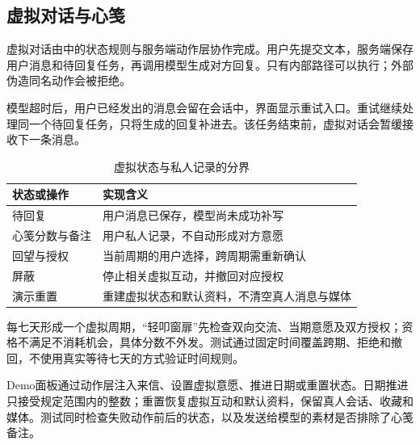 \subsection*{虚拟对话与心笺}
虚拟对话由中的状态规则与服务端动作层协作完成。用户先提交文本，服务端保存用户消息和待回复任务，再调用模型生成对方回复。只有内部路径可以执行；外部伪造同名动作会被拒绝。

模型超时后，用户已经发出的消息会留在会话中，界面显示重试入口。重试继续处理同一个待回复任务，只将生成的回复补进去。该任务结束前，虚拟对话会暂缓接收下一条消息。

\begin{table}[H]\centering\small
\caption{虚拟状态与私人记录的分界}
\begin{tabularx}{\linewidth}{@{}p{30mm}X@{}}\toprule
状态或操作 & 实现含义 \\ \midrule
待回复 & 用户消息已保存，模型尚未成功补写 \\
心笺分数与备注 & 用户私人记录，不自动形成对方意愿 \\
回望与授权 & 当前周期的用户选择，跨周期需重新确认 \\
屏蔽 & 停止相关虚拟互动，并撤回对应授权 \\
演示重置 & 重建虚拟状态和默认资料，不清空真人消息与媒体 \\ \bottomrule
\end{tabularx}\end{table}

每七天形成一个虚拟周期，“轻叩窗扉”先检查双向交流、当期意愿及双方授权；资格不满足不消耗机会，具体分数不外发。测试通过固定时间覆盖跨期、拒绝和撤回，不使用真实等待七天的方式验证时间规则。

Demo面板通过动作层注入来信、设置虚拟意愿、推进日期或重置状态。日期推进只接受规定范围内的整数；重置恢复虚拟互动和默认资料，保留真人会话、收藏和媒体。测试同时检查失败动作前后的状态，以及发送给模型的素材是否排除了心笺备注。
